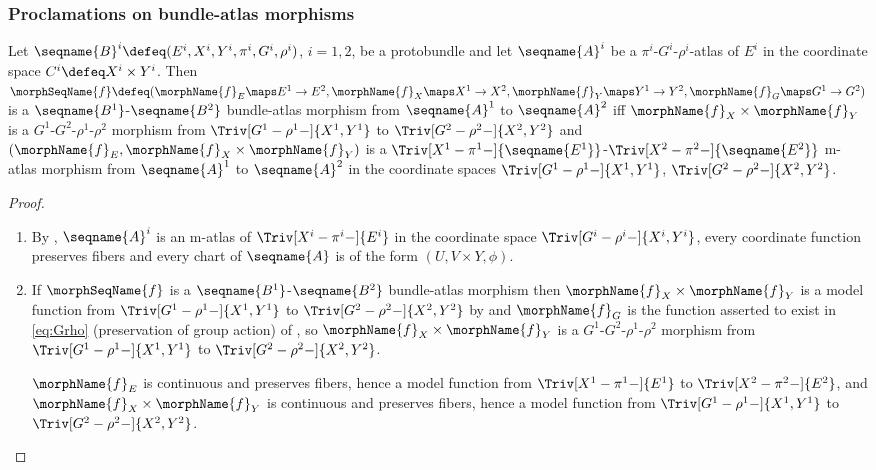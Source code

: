 \documentclass{article}
\begin{document}
\subsubsection{Proclamations on bundle-atlas morphisms}
\begin{lemma}
\label{lem:Bun-ATLmorph}
Let
$
  \seqname{B}^i
  \defeq
  (
    E^i,
    X^i,
    Y^i,
    \pi^i,
    G^i,
    \rho^i
  )
$, $i=1,2$, be a protobundle and let
$\seqname{A}^i$ be a $\pi^i$-$G^i$-$\rho^i$-atlas of $E^i$ in the
coordinate space
\nobreaks
  {{
    $C^i \defeq X^i \times Y^i$.
  }}
Then
$
  \morphSeqName{f}
  \defeq
  (
    \morphName{f}_E \maps E^1 \to E^2,
    \morphName{f}_X \maps X^1 \to X^2,
    \morphName{f}_Y \maps Y^1 \to Y^2,
    \morphName{f}_G \maps G^1 \to G^2
  )
$
is a $\seqname{B^1}$-$\seqname{B^2}$ bundle-atlas morphism from
$\seqname{A}^1$ to $\seqname{A}^2$ iff
$\morphName{f}_X \times \morphName{f}_Y$ is a
$G^1$-$G^2$-$\rho^1$-$\rho^2$ morphism from
$\Triv[G^1-\rho^1-]{X^1,Y^1}$ to $\Triv[G^2-\rho^2-]{X^2,Y^2}$ and
$(\morphName{f}_E, \morphName{f}_X \times \morphName{f}_Y)$ is a
$\Triv[X^1-\pi^1-]{\seqname{E^1}}$-$\Triv[X^2-\pi^2-]{\seqname{E^2}}$
m-atlas morphism from $\seqname{A}^1$ to $\seqname{A}^2$ in the
coordinate spaces $\Triv[G^1-\rho^1-]{X^1,Y^1}$,
$\Triv[G^2-\rho^2-]{X^2,Y^2}$.

\begin{proof}
\leavevmode
\begin{enumerate}
\item
By , $\seqname{A}^i$ is an m-atlas of
$\Triv[X^i-\pi^i-]{E^i}$ in the coordinate space
$\Triv[G^i-\rho^i-]{X^i,Y^i}$, every coordinate function preserves
fibers and every chart of $\seqname{A}$ is of the form
$(U, V \times Y, \phi)$.

\item
If $\morphSeqName{f}$ is a $\seqname{B^1}$-$\seqname{B^2}$ bundle-atlas
morphism then $\morphName{f}_X \times \morphName{f}_Y$ is a model function
from $\Triv[G^1-\rho^1-]{X^1,Y^1}$ to $\Triv[G^2-\rho^2-]{X^2,Y^2}$
by 
and $\morphName{f}_G$ is the function asserted to exist in
{
  \showlabelsinline
  \cref{eq:Grho}
}
(preservation of group action) of ,
so $\morphName{f}_X \times \morphName{f}_Y$ is a
$G^1$-$G^2$-$\rho^1$-$\rho^2$ morphism from
$\Triv[G^1-\rho^1-]{X^1,Y^1}$ to $\Triv[G^2-\rho^2-]{X^2,Y^2}$.

$\morphName{f}_E$ is continuous and preserves fibers, hence a model
function from $\Triv[X^1-\pi^1-]{E^1}$ to $\Triv[X^2-\pi^2-]{E^2}$, and
$\morphName{f}_X \times \morphName{f}_Y$ is continuous and preserves
fibers, hence a model function from $\Triv[G^1-\rho^1-]{X^1,Y^1}$ to
$\Triv[G^2-\rho^2-]{X^2,Y^2}$.


\end{enumerate}
\end{proof}
\end{lemma}
\end{document}
